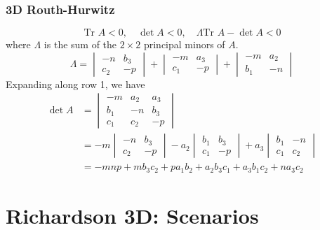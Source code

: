 \documentclass[12pt]{article}
\begin{document}
\subsubsection{3D Routh-Hurwitz}
  \begin{equation}
    \text{Tr }A<0,\quad \det{A}<0,\quad\Lambda\text{Tr }A-\det{A} <0
  \end{equation}
  where $\Lambda$ is the sum of the $2\times 2$ principal minors of $A$.
  \begin{equation}
    \Lambda = \begin{vmatrix}-n& b_3\\
	       c_2 & -p\end{vmatrix}+\begin{vmatrix}-m & a_3\\ c_1 & -p\end{vmatrix} + \begin{vmatrix}-m & a_2 \\ b_1 & -n\end{vmatrix}
  \end{equation}
  Expanding along row 1, we have
    \begin{align*}
      \det{A}&=\begin{vmatrix}
      -m & a_{2} & a_{3} \\
      b_1 & -n & b_3 \\
      c_1 & c_2 & -p
      \end{vmatrix}\\
	     &= -m\begin{vmatrix}-n& b_3\\
	       c_2 & -p\end{vmatrix}-a_2\begin{vmatrix}b_1 & b_3\\ c_1 & -p\end{vmatrix}+ a_3\begin{vmatrix}b_1 & -n \\ c_1 & c_2\end{vmatrix}\\
		   &= -mnp +mb_3 c_2 + pa_1 b_2 + a_2 b_3 c_1 + a_3 b_1 c_2 + n a_3 c_ 2
    \end{align*}
\section{Richardson 3D: Scenarios}
\end{document}
